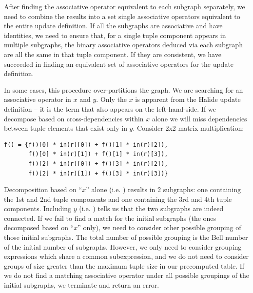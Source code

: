 After finding the associative operator equivalent to each subgraph separately, we need to combine the results into a set single associative operators equivalent to the entire update definition. If all the subgraphs are associative and have identities, we need to ensure that, for a single tuple component appears in multiple subgraphs, the binary associative operators deduced via each subgraph are all the same in that tuple component. If they are consistent, we have succeeded in finding an equivalent set of associative operators for the update definition.

In some cases, this procedure over-partitions the graph. We are searching for an associative operator in $x$ and $y$. Only the $x$ is apparent from the Halide update definition -- it is the term that also appears on the left-hand-side. If we decompose based on cross-dependencies within $x$ alone we will miss dependencies between tuple elements that exist only in $y$. Consider 2x2 matrix multiplication:

\begin{lstlisting}[caption={2x2 matrix multiplication. The four tuple components are the components in a 2x2 matrix in row order.}]
f() = {f()[0] * in(r)[0]) + f()[1] * in(r)[2]),
       f()[0] * in(r)[1]) + f()[1] * in(r)[3]),
       f()[2] * in(r)[0]) + f()[3] * in(r)[2]),
       f()[2] * in(r)[1]) + f()[3] * in(r)[3])}
\end{lstlisting}

Decomposition based on ``$x$'' alone (i.e. ) results in 2 subgraphs: one containing the 1st and 2nd tuple components and one containing the 3rd and 4th tuple components. Including $y$ (i.e. ) tells us that the two subgraphs are indeed connected. If we fail to find a match for the initial subgraphs (the ones decomposed based on ``$x$'' only), we need to consider other possible grouping of those initial subgraphs. The total number of possible grouping is the Bell number of the initial number of subgraphs. However, we only need to consider grouping expressions which share a common subexpression, and we do not need to consider groups of size greater than the maximum tuple size in our precomputed table. If we do not find a matching associative operator under all possible groupings of the initial subgraphs, we terminate and return an error.

